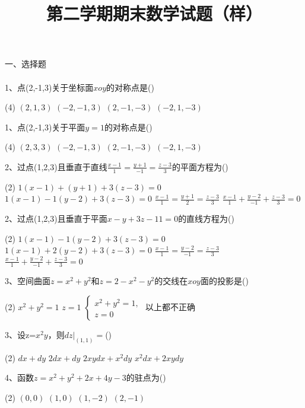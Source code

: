 \documentclass[12pt,a3paper]{article}
\title{第二学期期末数学试题（样）}
\date{}
\begin{document}
\maketitle


一、选择题
\\\\
1、点(2,-1,3)关于坐标面$xoy$的对称点是\hfill(\qquad)
\begin{tasks}(4)
    \task $(2,1,3)$
    \task $(-2,-1,3)$
    \task $(2,-1,-3)$
    \task $(-2,1,-3)$
    \\
\end{tasks}
1、点(2,-1,3)关于平面$y=1$的对称点是\hfill(\qquad)
\begin{tasks}(4)
    \task $(2,3,3)$
    \task $(-2,-1,3)$
    \task $(2,-1,-3)$
    \task $(-2,1,-3)$
    \\
\end{tasks}
2、过点(1,2,3)且垂直于直线$\frac{x-1}{1}=\frac{y+1}{-1}=\frac{z-3}{3}$的平面方程为\hfill(\qquad)
\begin{tasks}(2)
    \task $1(x-1)+(y+1)+3(z-3)=0$
    \task $1(x-1)-1(y-2)+3(z-3)=0$
    \task $\frac{x-1}{1}=\frac{y+1}{2}=\frac{z-3}{3}$
    \task $\frac{x-1}{1}+\frac{y-2}{-1}+\frac{z-3}{3}=0$
    \\
\end{tasks}
2、过点(1,2,3)且垂直于平面$x-y+3z-11=0$的直线方程为\hfill(\qquad)
\begin{tasks}(2)
    \task $1(x-1)-1(y-2)+3(z-3)=0$
    \task $1(x-1)+2(y-2)+3(z-3)=0$
    \task $\frac{x-1}{1}=\frac{y-2}{-1}=\frac{z-3}{3}$
    \\
    \task $\frac{x-1}{1}+\frac{y-2}{-1}+\frac{z-3}{3}=0$
\end{tasks}
3、空间曲面$z=x^2+y^2$和$z=2-x^2-y^2$的交线在$xoy$面的投影是\hfill(\qquad)
\begin{tasks}(2)
    \task $x^2+y^2=1$
    \task $z=1$
    \task $
    \begin{cases}
        x^2+y^2=1,\\
        z=0
    \end{cases}$
    \task 以上都不正确
    \\
\end{tasks}
3、设z=$x^2y$，则$dz|_{(1,1)}=$\hfill(\qquad)
\begin{tasks}(2)
    \task $dx+dy$
    \task $2dx+dy$
    \task $2xydx+x^2dy$
    \task $x^2dx+2xydy$
    \\
\end{tasks}
4、函数$z=x^2+y^2+2x+4y-3$的驻点为\hfill(\qquad)
\begin{tasks}(2)
    \task $(0,0)$
    \task $(1,0)$
    \task $(1,-2)$
    \task $(2,-1)$
    \\
\end{tasks}
\end{document}
